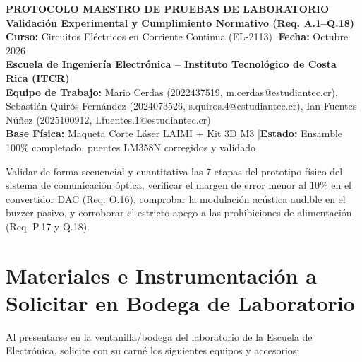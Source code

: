 \documentclass[10pt,a4paper]{article}
\begin{document}
\begin{center}
    {\LARGE \textbf{\color{tecblue}PROTOCOLO MAESTRO DE PRUEBAS DE LABORATORIO}}\\[0.2cm]
    {\large \textbf{Validación Experimental y Cumplimiento Normativo (Req. A.1--Q.18)}}\\[0.15cm]
    \textbf{Curso:} Circuitos Eléctricos en Corriente Continua (EL-2113) \quad|\quad \textbf{Fecha:} Octubre 2026\\[0.1cm]
    \textbf{Escuela de Ingeniería Electrónica -- Instituto Tecnológico de Costa Rica (ITCR)}\\[0.1cm]
    \textbf{Equipo de Trabajo:} Mario Cerdas (2022437519, m.cerdas@estudiantec.cr), Sebasti\'an Quir\'os Fern\'andez (2024073526, s.quiros.4@estudiantec.cr), Ian Fuentes N\'u\~nez (2025100912, I.fuentes.1@estudiantec.cr)\\[0.1cm]
    \textbf{Base F\'isica:} Maqueta Corte L\'aser LAIMI + Kit 3D M3 \quad|\quad \textbf{Estado:} Ensamble 100\% completado, puentes LM358N corregidos y validado
\end{center}

\vspace{-0.2cm}
\begin{tcolorbox}[colback=tecblue!5, colframe=tecblue, title=\textbf{OBJETIVO DE LA SESIÓN EXPERIMENTAL}]
Validar de forma secuencial y cuantitativa las 7 etapas del prototipo físico del sistema de comunicación óptica, verificar el margen de error menor al $10\%$ en el convertidor DAC (Req. O.16), comprobar la modulación acústica audible en el buzzer pasivo, y corroborar el estricto apego a las prohibiciones de alimentación (Req. P.17 y Q.18).
\end{tcolorbox}

\section{Materiales e Instrumentación a Solicitar en Bodega de Laboratorio}

Al presentarse en la ventanilla/bodega del laboratorio de la Escuela de Electrónica, solicite con su carné los siguientes equipos y accesorios:
\end{document}
